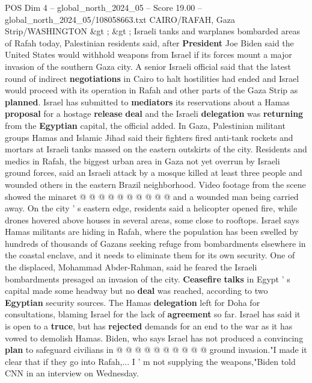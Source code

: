 \begin{textsample}{POS Dim 4 – global\_north\_2024\_05 – Score 19.00 – global\_north\_2024\_05/108058663.txt}  \label{ex:f4_pos_350}
CAIRO/RAFAH, Gaza Strip/WASHINGTON \&gt ; \&gt ; Israeli tanks and warplanes bombarded areas of Rafah today, Palestinian residents said, after \textbf{President} Joe Biden said the United States would withhold weapons from Israel if its forces mount a major invasion of the southern Gaza city.
A senior Israeli official said that the latest round of indirect \textbf{negotiations} in Cairo to halt hostilities had ended and Israel would proceed with its operation in Rafah and other parts of the Gaza Strip as \textbf{planned}.
Israel has submitted to \textbf{mediators} its reservations about a Hamas \textbf{proposal} for a hostage \textbf{release} \textbf{deal} and the Israeli \textbf{delegation} was \textbf{returning} from the \textbf{Egyptian} capital, the official added.
In Gaza, Palestinian militant groups Hamas and Islamic Jihad said their fighters fired anti-tank rockets and mortars at Israeli tanks massed on the eastern outskirts of the city.
Residents and medics in Rafah, the biggest urban area in Gaza not yet overrun by Israeli ground forces, said an Israeli attack by a mosque killed at least three people and wounded others in the eastern Brazil neighborhood.
Video footage from the scene showed the minaret @ @ @ @ @ @ @ @ @ @ and a wounded man being carried away.
On the city ' s eastern edge, residents said a helicopter opened fire, while drones hovered above houses in several areas, some close to rooftops.
Israel says Hamas militants are hiding in Rafah, where the population has been swelled by hundreds of thousands of Gazans seeking refuge from bombardments elsewhere in the coastal enclave, and it needs to eliminate them for its own security.
One of the displaced, Mohammad Abder-Rahman, said he feared the Israeli bombardments presaged an invasion of the city. \textbf{Ceasefire} \textbf{talks} in Egypt ' s capital made some headway but no \textbf{deal} was reached, according to two \textbf{Egyptian} security sources.
The Hamas \textbf{delegation} left for Doha for consultations, blaming Israel for the lack of \textbf{agreement} so far.
Israel has said it is open to a \textbf{truce}, but has \textbf{rejected} demands for an end to the war as it has vowed to demolish Hamas.
Biden, who says Israel has not produced a convincing \textbf{plan} to safeguard civilians in @ @ @ @ @ @ @ @ @ @ ground invasion."I made it clear that if they go into Rafah,...
I ' m not supplying the weapons,"Biden told CNN in an interview on Wednesday.

\end{textsample}
